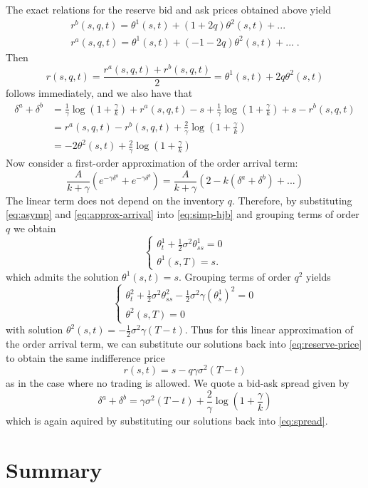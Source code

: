 The exact relations for the reserve bid and ask prices obtained above yield
\begin{gather}
    r^b(s,q,t)=\theta^1(s,t)+(1+2q)\theta^2(s,t)+...\\
    r^a(s,q,t)=\theta^1(s,t)+(-1-2q)\theta^2(s,t)+...\;.
\end{gather}
Then
\begin{equation}\label{eq:reserve-price}
    r(s,q,t)=\frac{r^a(s,q,t)+r^b(s,q,t)}{2}=\theta^1(s,t)+2q\theta^2(s,t)
\end{equation}
follows immediately, and we also have that
\begin{equation}\label{eq:spread}
    \begin{aligned}
        \delta^a+\delta^b&=\frac{1}{\gamma}\log\left(1+\frac{\gamma}{k}\right)+r^a(s,q,t)-s+\frac{1}{\gamma}\log\left(1+\frac{\gamma}{k}\right)+s-r^b(s,q,t)\\
        &=r^a(s,q,t)-r^b(s,q,t)+\frac{2}{\gamma}\log\left(1+\frac{\gamma}{k}\right)\\
        &=-2\theta^2(s,t)+\frac{2}{\gamma}\log\left(1+\frac{\gamma}{k}\right)
    \end{aligned}
\end{equation}
Now consider a first-order approximation of the order arrival term:
\begin{equation}\label{eq:approx-arrival}
    \frac{A}{k+\gamma}(e^{-\gamma\delta^a}+e^{-\gamma\delta^b})=\frac{A}{k+\gamma}(2-k(\delta^a+\delta^b)+...)
\end{equation}
The linear term does not depend on the inventory $q$. Therefore, by substituting
\ref{eq:asymp} and \ref{eq:approx-arrival} into \ref{eq:simp-hjb} and 
grouping terms of order $q$ we obtain
\begin{equation}
    \begin{cases} 
        \theta^1_t+\frac{1}{2}\sigma^2\theta^1_{ss}=0\\
        \theta^1(s,T)=s.
    \end{cases}
\end{equation}
which admits the solution $\theta^1(s,t)=s$. Grouping terms of order $q^2$ yields
\begin{equation}
    \begin{cases}
        \theta^2_t+\frac{1}{2}\sigma^2\theta^2_{ss}-\frac{1}{2}\sigma^2\gamma(\theta^1_s)^2=0\\
        \theta^2(s,T)=0
    \end{cases}
\end{equation}
with solution $\theta^2(s,t)=-\frac{1}{2}\sigma^2\gamma(T-t)$.
Thus for this linear approximation of the order arrival term, we can substitute our
solutions back into \ref{eq:reserve-price} to obtain the same indifference price
\begin{equation}
    r(s,t)=s-q\gamma\sigma^2(T-t)
\end{equation}
as in the case where no trading is allowed. We quote a bid-ask spread given by
\begin{equation}
    \delta^a+\delta^b=\gamma\sigma^2(T-t)+\frac{2}{\gamma}\log\left(1+\frac{\gamma}{k}\right)
\end{equation}
which is again aquired by substituting our solutions back into \ref{eq:spread}.

\section{Summary}